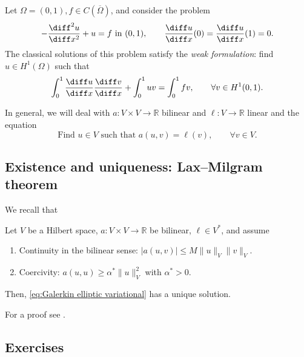 \begin{example}
    \label{ex:Galerkin Helmholtz d=1}
    Let $\Omega = (0,1), f \in C(\overline \Omega)$, and consider the problem
    \begin{equation*}
        -\frac{\diff^2 u}{\diff x^2} + u = f \text{ in } (0,1), \qquad \frac{\diff u}{\diff x}(0) = \frac{\diff u}{\diff x}(1) = 0.
    \end{equation*}
    The classical solutions of this problem satisfy the \emph{weak formulation}: find $u \in H^1 (\Omega)$ such that
    \begin{equation*}
        \int_{0}^1 \frac{\diff u}{\diff x} \frac{\diff v}{\diff x} + \int_0^1 u v = \int_0^1 f v, \qquad \forall v \in H^1 (0,1).
    \end{equation*}
\end{example}
In general, we will deal with $a:V\times V \to \mathbb R$ bilinear and $\ell:V \to \mathbb R$ linear and the equation
\begin{equation}
    \tag{E}
    \label{eq:Galerkin elliptic variational}
    \text{Find }u \in V \text{ such that } a(u,v) = \ell (v) , \qquad \forall v \in V.
\end{equation}

\subsection{Existence and uniqueness: Lax--Milgram theorem}

We recall that
\begin{strongtheorem}
    \label{thm:Lax-Milgram}
    Let $V$ be a Hilbert space, $a: V \times V \to \mathbb R$ be bilinear, $\ell \in V^*$, and assume
    \begin{enumerate}
        \item Continuity in the bilinear sense: $|a(u,v)| \le M \|u\|_V \|v\|_V$.
        \item Coercivity: $a(u,u) \ge \alpha^* \|u\|_V^2$ with $\alpha^* > 0$.
    \end{enumerate}
    Then, \eqref{eq:Galerkin elliptic variational} has a unique solution.
\end{strongtheorem}
For a proof see \cite[Corollary 5.8]{Brezis2010}.

\subsection*{Exercises}

